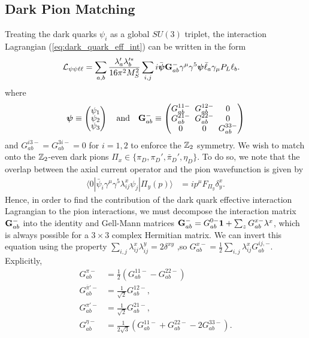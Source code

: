 \subsection{Dark Pion Matching}
Treating the dark quarks $\psi_i$ as a global $SU(3)$ triplet, the interaction Lagrangian (\ref{eq:dark_quark_eff_int}) can be written in the form 
\begin{align}
    {\cal L}_{\psi\psi\ell\ell} &= \sum_{a,b}\frac{\lambda_a'\lambda_b'^*}{16\pi^2 M_S^2} \sum_{i,j}{
    i\bar{\boldsymbol \psi}{\bf G}_{ab}^{-}\gamma^\mu \gamma^5{\boldsymbol{\psi}} }\bar{\ell}_a \gamma_\mu P_L \ell_b.
\end{align}
where
\begin{align}
   \setlength{\arraycolsep}{0.1cm}\renewcommand{\arraystretch}{0.6}  {\boldsymbol \psi} \equiv \begin{pmatrix}\psi_1 \\ \psi_2 \\ \psi_3 \end{pmatrix}\ \ \ {\rm and} \ \ \ {\bf G}_{ab}^{-} \equiv \begin{pmatrix}G^{11-}_{ab} & G^{12-}_{ab} & 0 \\ G^{21-}_{ab} & G^{22-}_{ab} & 0 \\ 0 & 0 & G^{33-}_{ab}\end{pmatrix}
\end{align}
and $G_{ab}^{i3-} = G_{ab}^{3i-} = 0$ for $i = 1, 2$ to enforce the ${\Bbb Z}_2$ symmetry. We wish to match onto the ${\Bbb Z}_2$-even dark pions $\Pi_x \in \{\pi_D, \pi_D', \bar{\pi}_D', \eta_D\}$. To do so, we note that the overlap between the axial current operator and the pion wavefunction is given by
\begin{align}
    \langle 0|\bar{\psi}_i \gamma^\mu\gamma^5 \lambda^x_{ij}\psi_j|\Pi_y(p)\rangle &= ip^\mu F_{\Pi_y}\delta^{x}_{y}.
\end{align}
Hence, in order to find the contribution of the dark quark effective interaction Lagrangian to the pion interactions, we must decompose the interaction matrix ${\bf G}_{ab}^-$ into the identity and Gell-Mann matrices ${\bf G}_{ab}^- = G_{ab}^{0-}{\bf 1} + \sum_{z}G_{ab}^{x-}\lambda^{x}$, which is always possible for a $3\times 3$ complex Hermitian matrix. We can invert this equation using the property $\sum_{i,j} \lambda_{ij}^x\lambda_{ij}^y = 2\delta^{xy}$ ,so $G_{ab}^{x-} = \frac{1}{2}\sum_{i,j}\lambda_{ij}^x G_{ab}^{ij,-}$. Explicitly,
\begin{align}
    G_{ab}^{\pi-} &= \frac{1}{2}(G_{ab}^{11-} -G_{ab}^{22-} )\\
    G_{ab}^{\bar{\pi}'-} &= \frac{1}{\sqrt{2}}G_{ab}^{12-},\\
    G_{ab}^{\pi'-} &= \frac{1}{\sqrt{2}}G_{ab}^{21-},\\
    G_{ab}^{\eta -} &= \frac{1}{2\sqrt{3}}(G_{ab}^{11-} + G_{ab}^{22-} - 2 G_{ab}^{33-}).
\end{align}
